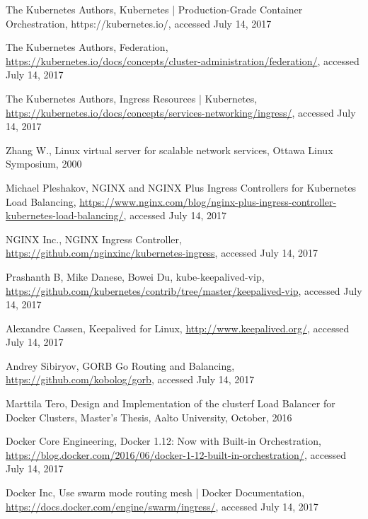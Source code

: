\begin{thebibliography}{99}%

The Kubernetes Authors, Kubernetes | Production-Grade Container Orchestration, https://kubernetes.io/, accessed July 14, 2017

The Kubernetes Authors, Federation, \url{https://kubernetes.io/docs/concepts/cluster-administration/federation/}, accessed July 14, 2017

The Kubernetes Authors, Ingress Resources | Kubernetes, \url{https://kubernetes.io/docs/concepts/services-networking/ingress/}, accessed July 14, 2017

Zhang W., Linux virtual server for scalable network services, Ottawa Linux Symposium, 2000

Michael Pleshakov, NGINX and NGINX Plus Ingress Controllers for Kubernetes Load Balancing, \url{https://www.nginx.com/blog/nginx-plus-ingress-controller-kubernetes-load-balancing/}, accessed July 14, 2017

NGINX Inc., NGINX Ingress Controller, \url{https://github.com/nginxinc/kubernetes-ingress}, accessed July 14, 2017

Prashanth B, Mike Danese, Bowei Du, kube-keepalived-vip, \url{https://github.com/kubernetes/contrib/tree/master/keepalived-vip}, accessed July 14, 2017

Alexandre Cassen, Keepalived for Linux, \url{http://www.keepalived.org/}, accessed July 14, 2017

Andrey Sibiryov, GORB Go Routing and Balancing, \url{https://github.com/kobolog/gorb}, accessed July 14, 2017

Marttila Tero, Design and Implementation of the clusterf Load Balancer for Docker Clusters, Master's Thesis, Aalto University, October, 2016

Docker Core Engineering, Docker 1.12: Now with Built-in Orchestration, \url{https://blog.docker.com/2016/06/docker-1-12-built-in-orchestration/}, accessed July 14, 2017

Docker Inc, Use swarm mode routing mesh | Docker Documentation, \url{https://docs.docker.com/engine/swarm/ingress/}, accessed July 14, 2017


\end{thebibliography}

